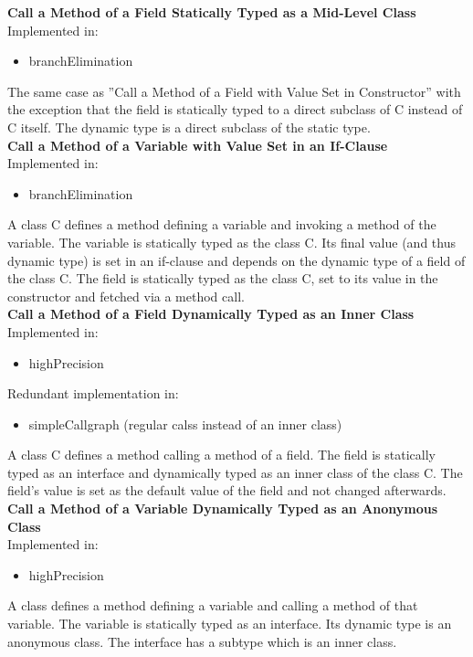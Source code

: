 \documentclass{article}
\begin{document}
\noindent
\textbf{Call a Method of a Field Statically Typed as a Mid-Level Class}\\
Implemented in: 
\begin{itemize}
    \item branchElimination
\end{itemize}
The same case as ''Call a Method of a Field with Value Set in Constructor'' with the exception that the field is statically typed to a direct subclass of C instead of C itself. The dynamic type is a direct subclass of the static type.\\

\noindent
\textbf{Call a Method of a Variable with Value Set in an If-Clause}\\
Implemented in: 
\begin{itemize}
    \item branchElimination
\end{itemize}
A class C defines a method defining a variable and invoking a method of the variable. The variable is statically typed as the class C. Its final value (and thus dynamic type) is set in an if-clause and depends on the dynamic type of a field of the class C. The field is statically typed as the class C, set to its value in the constructor and fetched via a method call.\\

\noindent
\textbf{Call a Method of a Field Dynamically Typed as an Inner Class}\\
Implemented in: 
\begin{itemize}
    \item highPrecision
\end{itemize}
Redundant implementation in: 
\begin{itemize}
    \item simpleCallgraph (regular calss instead of an inner class)
\end{itemize}
A class C defines a method calling a method of a field. The field is statically typed as an interface and dynamically typed as an inner class of the class C. The field's value is set as the default value of the field and not changed afterwards.\\

\noindent
\textbf{Call a Method of a Variable Dynamically Typed as an Anonymous Class}\\
Implemented in: 
\begin{itemize}
    \item highPrecision
\end{itemize}
A class defines a method defining a variable and calling a method of that variable. The variable is statically typed as an interface. Its dynamic type is an anonymous class. The interface has a subtype which is an inner class.\\
\end{document}
